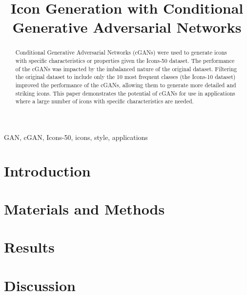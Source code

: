 \documentclass[conference]{IEEEtran}
\begin{document}
    \title{Icon Generation with Conditional Generative Adversarial Networks}

    \author{
    }
    \maketitle

    \begin{abstract}
        Conditional Generative Adversarial Networks (cGANs) were used to generate icons with specific characteristics or properties given the Icons-50 dataset.
        The performance of the cGANs was impacted by the imbalanced nature of the original dataset.
        Filtering the original dataset to include only the 10 most frequent classes (the Icons-10 dataset) improved the performance of the cGANs, allowing them to generate more detailed and striking icons.
        This paper demonstrates the potential of cGANs for use in applications where a large number of icons with specific characteristics are needed.
    \end{abstract}

    \begin{IEEEkeywords}
        GAN, cGAN, Icons-50, icons, style, applications
    \end{IEEEkeywords}


    \section{Introduction}\label{sec:introduction}
    


    \section{Materials and Methods}\label{sec:materials-and-methods}
    


    \section{Results}\label{sec:results}
    


    \section{Discussion}\label{sec:discussion}
\end{document}
